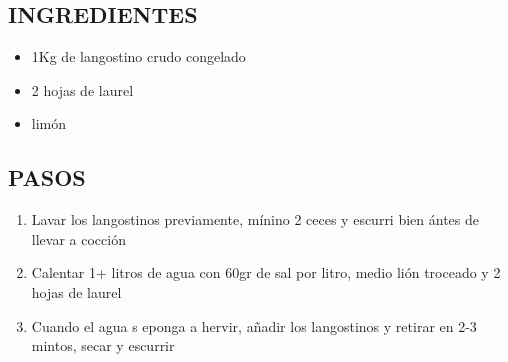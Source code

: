 
\subsection*{INGREDIENTES}
\begin{itemize}
    \item 1Kg de langostino crudo congelado
    \item 2 hojas de laurel
    \item {} limón
\end{itemize}

\subsection*{PASOS}
\begin{enumerate}
    \item Lavar los langostinos previamente, mínino 2 ceces y escurri bien ántes de llevar a cocción
    \item Calentar 1+ litros de agua con 60gr de sal por litro, medio lión troceado y 2 hojas de laurel
    \item Cuando el agua s eponga a hervir, añadir los langostinos y retirar en 2-3 mintos, secar y escurrir
\end{enumerate}
